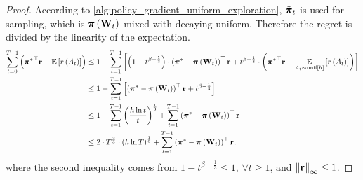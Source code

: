 \begin{proof}
According to \cref{alg:policy_gradient_uniform_exploration}, $\tilde{{\boldsymbol{\pi}}}_t$ is used for sampling, which is ${\boldsymbol{\pi}}\left( {\mathbf{W}}_t \right)$ mixed with decaying uniform. Therefore the regret is divided by the linearity of the expectation.
\begin{equation}
\label{eq:total_regret_decomposition}
\begin{split}
    \sum\limits_{t=0}^{T-1}{ \left( {{\boldsymbol{\pi}}^*}^\top {\mathbf{r}} - {\mathbb{E}} \left[ r\left(A_t\right) \right] \right) } &\le 1 + \sum\limits_{t=1}^{T-1}{ \left[ \left( 1 - t^{ \beta - \frac{1}{3}} \right) \cdot \left( {{\boldsymbol{\pi}}^*} - {\boldsymbol{\pi}}\left( {\mathbf{W}}_t \right) \right)^\top {\mathbf{r}} + t^{ \beta - \frac{1}{3}} \cdot \left( {{\boldsymbol{\pi}}^*}^\top {\mathbf{r}} - \operatorname*{{\mathbb{E}}}\limits_{A_t \sim {\text{unif}}[h]}{ \left[ r\left(A_t\right) \right] } \right) \right]} \\
    &\le 1 + \sum\limits_{t=1}^{T-1}{ \left[ \left( {{\boldsymbol{\pi}}^*} - {\boldsymbol{\pi}}\left( {\mathbf{W}}_t \right) \right)^\top {\mathbf{r}} + t^{ \beta - \frac{1}{3}} \right]} \\
    &\le 1 + \sum\limits_{t=1}^{T-1}{ \left( \frac{ h \ln{t} }{t} \right)^{\frac{1}{3}} } + \sum\limits_{t=1}^{T-1}{ \left( {{\boldsymbol{\pi}}^*} - {\boldsymbol{\pi}}\left( {\mathbf{W}}_t \right) \right)^\top {\mathbf{r}} } \\
    &\le 2 \cdot T^{\frac{2}{3}} \cdot \left( h \ln{T} \right)^{\frac{1}{3}} + \sum\limits_{t=1}^{T-1}{ \left( {{\boldsymbol{\pi}}^*} - {\boldsymbol{\pi}}\left( {\mathbf{W}}_t \right) \right)^\top {\mathbf{r}} },
\end{split}
\end{equation}
where the second inequality comes from $1 - t^{ \beta - \frac{1}{3}} \le 1$, $\forall t \ge 1$, and $\left\| {\mathbf{r}} \right\|_\infty \le 1$.


\end{proof}
